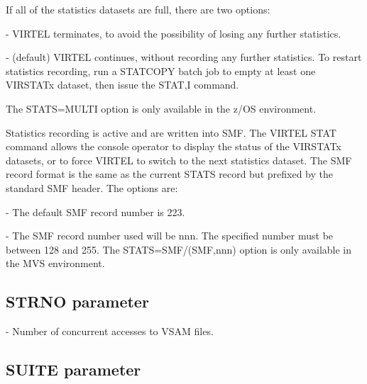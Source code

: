 \documentclass[letterpaper,10pt,english]{sphinxmanual}
\begin{document}
If all of the statistics datasets are full, there are two options:

 - VIRTEL terminates, to avoid the possibility of losing any further statistics.

 - (default) VIRTEL continues, without recording any further statistics. To restart statistics recording, run a STATCOPY batch job to empty at least one VIRSTATx dataset, then issue the STAT,I command.

The STATS=MULTI option is only available in the z/OS environment.

 Statistics recording is active and are written into SMF. The VIRTEL STAT command allows the console operator to display the status of the VIRSTATx datasets, or to force VIRTEL to switch to the next statistics dataset. The SMF record format is the same as the current STATS record but prefixed by the standard SMF header. The options are:

 - The default SMF record number is 223.

 - The SMF record number used will be nnn. The specified number must be between 128 and 255. The STATS=SMF/(SMF,nnn) option is only available in the MVS environment.

\ignorespaces 

\subsection{STRNO parameter}
\label{\detokenize{Installation_Guide:strno-parameter}}\label{\detokenize{Installation_Guide:index-118}}
\begin{sphinxVerbatim}[commandchars=\\\{\}]
 
\end{sphinxVerbatim}

 - Number of concurrent accesses to VSAM files.

\ignorespaces 

\subsection{SUITE parameter}
\label{\detokenize{Installation_Guide:suite-parameter}}\label{\detokenize{Installation_Guide:index-119}}
\begin{sphinxVerbatim}[commandchars=\\\{\}]
 
\end{sphinxVerbatim}
\end{document}

